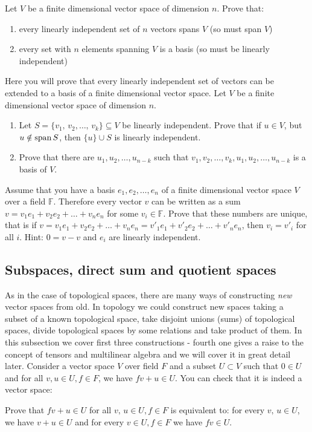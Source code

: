 \begin{exercise}
  Let $V$ be a finite dimensional vector space of dimension $n$. Prove that:
  \begin{enumerate}
  \item every linearly independent set of $n$ vectors spans $V$ (so must span $V$)
  \item every set with $n$ elements spanning $V$ is a basis (so must be linearly independent)
  \end{enumerate}
\end{exercise}

\begin{prob}
  Here you will prove that every linearly independent set of vectors can be extended to a basis of a finite dimensional vector space. Let $V$ be a finite dimensional vector space
  of dimension $n$.
  \begin{enumerate}
    \item Let $S=\{v_1,\, v_2,\dots,\, v_k\}\subseteq V$ be linearly independent. Prove that if $u\in V$, but $u\notin \text{span\,} S$, then $\{u\}\cup S$ is linearly independent.
    \item Prove that there are $u_1, u_2, \dots,u_{n-k}$ such that $v_1, v_2, \dots, v_k, u_1, u_2,\dots, u_{n-k}$ is a basis of $V$.
  \end{enumerate}
\end{prob}

\begin{prob}
  Assume that you have a basis $e_1, e_2,\dots,e_n$ of a finite dimensional vector space $V$ over a field $\mathbb F$. Therefore every vector $v$ can be written as a sum
  $v=v_1e_1+v_2e_2+\dots+v_ne_n$ for some $v_i\in \mathbb F$. Prove that these numbers are unique, that is if $v=v_1e_1+v_2e_2+\dots+v_ne_n=v'_1e_1+v'_2e_2+\dots+v'_ne_n$, then
  $v_i=v'_i$ for all $i$. Hint: $0=v-v$ and $e_i$ are linearly independent.
\end{prob}

\subsection{Subspaces, direct sum and quotient spaces}
As in the case of topological spaces, there are many ways of constructing \textit{new} vector spaces from old. In topology we could construct
new spaces taking a subset of a known topological space, take disjoint unions (sums) of topological spaces, divide topological spaces by some relations
and take product of them. In this subsection we cover first three constructions - fourth one gives a raise to the concept of tensors and multilinear algebra and we will cover
it in great detail later.
Consider a vector space $V$ over field $F$ and a subset $U\subset V$ such that $0\in U$ and for all $v, u\in U, f\in F$, we have $fv+u\in U$. You can check that it is indeed a vector space:
\begin{prob}
  Prove that $fv+u\in U$ for all $v,\, u\in U, f\in F$ is equivalent to: for every $v,\, u\in U$, we have $v+u\in U$ and for every $v\in U, f\in F$ we have $fv\in U$.
\end{prob}

